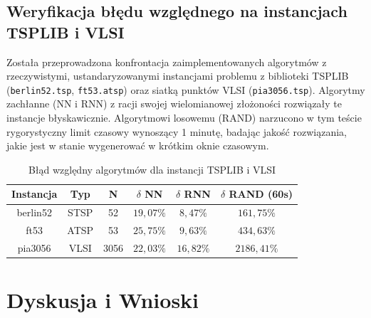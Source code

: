 \documentclass[conference]{IEEEtran}
\begin{document}
        \subsection{Weryfikacja błędu względnego na instancjach TSPLIB i VLSI}
            Została przeprowadzona konfrontacja zaimplementowanych algorytmów z rzeczywistymi, ustandaryzowanymi instancjami problemu z biblioteki TSPLIB (\texttt{berlin52.tsp}, \texttt{ft53.atsp}) oraz siatką punktów VLSI (\texttt{pia3056.tsp}). Algorytmy zachłanne (NN i RNN) z racji swojej wielomianowej złożoności rozwiązały te instancje błyskawicznie. Algorytmowi losowemu (RAND) narzucono w tym teście rygorystyczny limit czasowy wynoszący 1 minutę, badając jakość rozwiązania, jakie jest w stanie wygenerować w krótkim oknie czasowym.
            \begin{table}[htbp]
                \caption{Błąd względny algorytmów dla instancji TSPLIB i VLSI}
                \begin{center}
                \begin{tabular}{|c|c|c|c|c|c|}
                \hline
                \textbf{Instancja} & \textbf{Typ} & \textbf{N} & \textbf{$\delta$ NN} & \textbf{$\delta$ RNN} & \textbf{$\delta$ RAND (60s)} \\ \hline
                berlin52 & STSP & 52 & $19{,}07\%$ & $8{,}47\%$ & $161{,}75\%$ \\ \hline
                ft53 & ATSP & 53 & $25{,}75\%$ & $9{,}63\%$ & $434{,}63\%$ \\ \hline
                pia3056 & VLSI & 3056 & $22{,}03\%$ & $16{,}82\%$ & $2186{,}41\%$ \\ \hline
                \end{tabular}
                \label{tab:tsplib_vlsi_blad}
                \end{center}
            \end{table}


    \section{Dyskusja i Wnioski}
\end{document}
